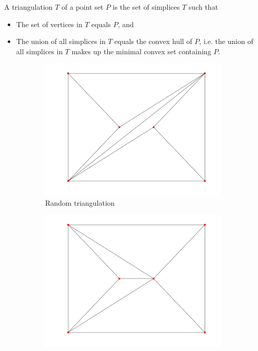 \begin{definition}[Triangulation]
A triangulation $T$ of a point set $P$ is the set of simplices $T$ such that
\begin{itemize}
    \item The set of vertices in $T$ equals $P$, and
    \item The union of all simplices in $T$ equals the convex hull of $P$, i.e. the union of all simplices in $T$ makes up the minimal convex set containing $P$.
\end{itemize}
\end{definition}
\begin{figure}[ht]
    \centering
    \begin{subfigure}[b]{0.4\textwidth}
        \centering
        \includegraphics[width=\textwidth]{report/Images/Theory/triangulation/triangulation_random.png}
        \caption{Random triangulation}
        \label{fig:triangulation-random}
    \end{subfigure}
    \begin{subfigure}[b]{0.4\textwidth}
        \centering
        \includegraphics[width=\textwidth]{report/Images/Theory/triangulation/triangulation_delaunay.png}

\end{subfigure}
\end{figure}
